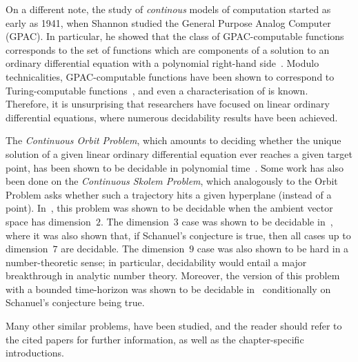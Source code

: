 On a different note, the study of \emph{continous} models of computation started as early as 1941, when Shannon studied the General Purpose Analog Computer (GPAC).
In particular, he showed that the class of GPAC-computable functions corresponds to the set of functions which are components of a solution to an ordinary differential equation with a polynomial right-hand side~\cite{Shannon1941}.
Modulo technicalities, GPAC-computable functions have been shown to correspond to Turing-computable functions~\cite{Bournez1,Bournez2}, and even a characterisation of \PTIME{} is known.
Therefore, it is unsurprising that researchers have focused on linear ordinary differential equations, where numerous decidability results have been achieved.

The \emph{Continuous Orbit Problem}, which amounts to deciding whether the unique solution of a given linear ordinary differential equation ever reaches a given target point, has been shown to be decidable in polynomial time~\cite{Hainry08,ContinuousOrbitIPL}.
Some work has also been done on the \emph{Continuous Skolem Problem}, which analogously to the Orbit Problem asks whether such a trajectory hits a given hyperplane (instead of a point).
In~\cite{ContinuousSkolem}, this problem was shown to be decidable when the ambient vector space has dimension~$2$. The dimension~$3$ case was shown to be decidable in~\cite{VCthesis}, where it was also shown that, if Schanuel's conjecture is true, then all cases up to dimension~$7$ are decidable. The dimension~$9$ case was also shown to be hard in a number-theoretic sense; in particular, decidability would entail a major breakthrough in analytic number theory.
Moreover, the version of this problem with a bounded time-horizon was shown to be decidable in~\cite{ContinuousSkolem3} conditionally on Schanuel's conjecture being true.

Many other similar problems, have been studied, and the reader should refer to the cited papers for further information, as well as the chapter-specific introductions.
